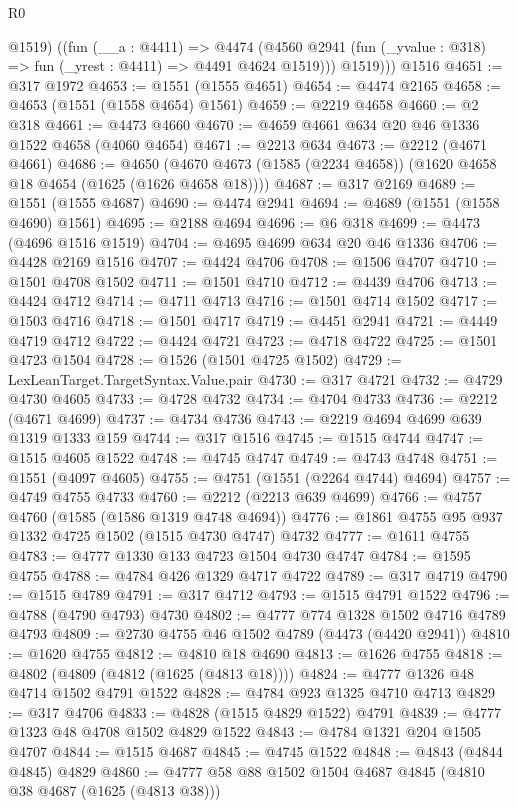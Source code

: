 \begin{lexlean}{R0}
\begin{coremodule}
          @1519)
        ((fun (__a : @4411) =>
        @4474 (@4560 @2941 (fun (_yvalue : @318) => fun (_yrest : @4411) => @4491 @4624 @1519)))
          @1519)))
    @1516
@4651 := @317 @1972
@4653 := @1551 (@1555 @4651)
@4654 := @4474 @2165
@4658 := @4653 (@1551 (@1558 @4654) @1561)
@4659 := @2219 @4658
@4660 := @2 @318
@4661 := @4473 @4660
@4670 := @4659 @4661 @634 @20 @46 @1336 @1522 @4658 (@4060 @4654)
@4671 := @2213 @634
@4673 := @2212 (@4671 @4661)
@4686 := @4650 (@4670 @4673 (@1585 (@2234 @4658)) (@1620 @4658 @18 @4654 (@1625 (@1626 @4658 @18))))
@4687 := @317 @2169
@4689 := @1551 (@1555 @4687)
@4690 := @4474 @2941
@4694 := @4689 (@1551 (@1558 @4690) @1561)
@4695 := @2188 @4694
@4696 := @6 @318
@4699 := @4473 (@4696 @1516 @1519)
@4704 := @4695 @4699 @634 @20 @46 @1336
@4706 := @4428 @2169 @1516
@4707 := @4424 @4706
@4708 := @1506 @4707
@4710 := @1501 @4708 @1502
@4711 := @1501 @4710
@4712 := @4439 @4706
@4713 := @4424 @4712
@4714 := @4711 @4713
@4716 := @1501 @4714 @1502
@4717 := @1503 @4716
@4718 := @1501 @4717
@4719 := @4451 @2941
@4721 := @4449 @4719 @4712
@4722 := @4424 @4721
@4723 := @4718 @4722
@4725 := @1501 @4723 @1504
@4728 := @1526 (@1501 @4725 @1502)
@4729 := LexLeanTarget.TargetSyntax.Value.pair
@4730 := @317 @4721
@4732 := @4729 @4730 @4605
@4733 := @4728 @4732
@4734 := @4704 @4733
@4736 := @2212 (@4671 @4699)
@4737 := @4734 @4736
@4743 := @2219 @4694 @4699 @639 @1319 @1333 @159
@4744 := @317 @1516
@4745 := @1515 @4744
@4747 := @1515 @4605 @1522
@4748 := @4745 @4747
@4749 := @4743 @4748
@4751 := @1551 (@4097 @4605)
@4755 := @4751 (@1551 (@2264 @4744) @4694)
@4757 := @4749 @4755 @4733
@4760 := @2212 (@2213 @639 @4699)
@4766 := @4757 @4760 (@1585 (@1586 @1319 @4748 @4694))
@4776 := @1861 @4755 @95 @937 @1332 @4725 @1502 (@1515 @4730 @4747) @4732
@4777 := @1611 @4755
@4783 := @4777 @1330 @133 @4723 @1504 @4730 @4747
@4784 := @1595 @4755
@4788 := @4784 @426 @1329 @4717 @4722
@4789 := @317 @4719
@4790 := @1515 @4789
@4791 := @317 @4712
@4793 := @1515 @4791 @1522
@4796 := @4788 (@4790 @4793) @4730
@4802 := @4777 @774 @1328 @1502 @4716 @4789 @4793
@4809 := @2730 @4755 @46 @1502 @4789 (@4473 (@4420 @2941))
@4810 := @1620 @4755
@4812 := @4810 @18 @4690
@4813 := @1626 @4755
@4818 := @4802 (@4809 (@4812 (@1625 (@4813 @18))))
@4824 := @4777 @1326 @48 @4714 @1502 @4791 @1522
@4828 := @4784 @923 @1325 @4710 @4713
@4829 := @317 @4706
@4833 := @4828 (@1515 @4829 @1522) @4791
@4839 := @4777 @1323 @48 @4708 @1502 @4829 @1522
@4843 := @4784 @1321 @204 @1505 @4707
@4844 := @1515 @4687
@4845 := @4745 @1522
@4848 := @4843 (@4844 @4845) @4829
@4860 := @4777 @58 @88 @1502 @1504 @4687 @4845 (@4810 @38 @4687 (@1625 (@4813 @38)))

\end{coremodule}
\end{lexlean}
